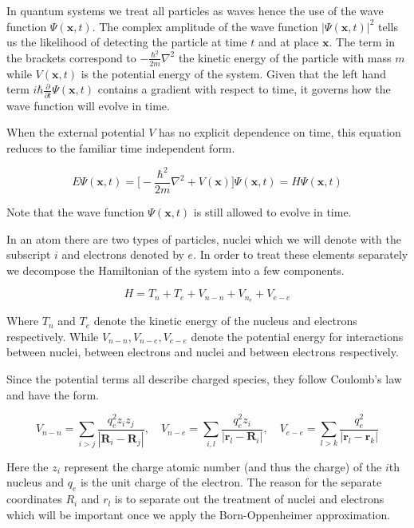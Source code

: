 In quantum systems we treat all particles as waves hence the use of the wave function $\Psi (\textbf{x},t)$. The complex amplitude of the wave function $|\Psi (\textbf {x}, t)|^2$ tells us the likelihood of detecting the particle at time $t$ and at place $\textbf{x}$. The term in the brackets correspond to $-\frac{\hbar ^2}{2m}\nabla^2 $ the kinetic energy of the particle with mass $m$ while $V (\textbf{x}, t)$ is the potential energy of the system. Given that the left hand term $i\hbar \frac {\partial}{\partial t} \Psi (\textbf{x},t)$ contains a gradient with respect to time, it governs how the wave function will evolve in time.

When the external potential $V$ has no explicit dependence on time, this equation reduces to the familiar time independent form. 

\begin{equation}
	E \Psi (\textbf{x}, t) = \big[ -\frac{\hbar ^2}{2m}\nabla^2 + V (\textbf{x}) \big] \Psi (\textbf{x}, t) = H \Psi(\textbf{x}, t) 
 \end{equation}

Note that the wave function $\Psi (\textbf {x}, t)$ is still allowed to evolve in time. 

In an atom there are two types of particles, nuclei which we will denote with the subscript $i$ and electrons denoted by $e$. In order to treat these elements separately we decompose the Hamiltonian of the system into a few components. 

\begin {equation}
H = T_n + T_e + V_{n-n} + V_{n_e} + V_{e-e}
\end{equation}

Where $T_n$ and $T_e$ denote the kinetic energy of the nucleus and electrons respectively. While $V_{n-n}, V_{n-e}, V_{e-e}$ denote the potential energy for interactions between nuclei, between electrons and nuclei and between electrons respectively.

Since the potential terms all describe charged species, they follow Coulomb's law and have the form.

\begin{equation}
	V_{n-n} = \sum_{i>j} \frac{q_e^2 z_i z_j }{|\textbf{R}_i-\textbf{R}_j|},\quad V_{n-e} = \sum_{i,l} \frac{q_e^2 z_i }{|\textbf{r}_l-\textbf{R}_i|},\quad  V_{e-e}  = \sum_{l>k} \frac{q_e^2 }{|\textbf{r}_l-\textbf{r}_k|}
\end{equation}

Here the $z_i$ represent the charge atomic number (and thus the charge) of the $i$th nucleus and $q_e$ is the unit charge of the electron. The reason for the separate coordinates $R_i$ and $r_l$ is to separate out the treatment of nuclei and electrons which will be important once we apply the Born-Oppenheimer approximation.

